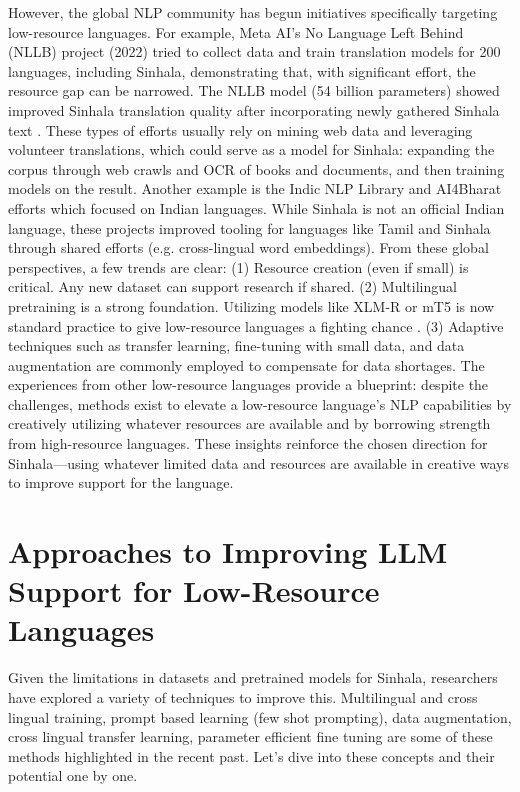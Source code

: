 \documentclass[12pt]{uomthesis}
\begin{document}
However, the global NLP community has begun initiatives specifically targeting low-resource languages. For example, Meta AI's No Language Left Behind (NLLB) project (2022) tried to collect data and train translation models for 200 languages, including Sinhala, demonstrating that, with significant effort, the resource gap can be narrowed. The NLLB model (54 billion parameters) showed improved Sinhala translation quality after incorporating newly gathered Sinhala text \cite{15}. These types of efforts usually rely on mining web data and leveraging volunteer translations, which could serve as a model for Sinhala: expanding the corpus through web crawls and OCR of books and documents, and then training models on the result. Another example is the Indic NLP Library and AI4Bharat efforts which focused on Indian languages. While Sinhala is not an official Indian language, these projects improved tooling for languages like Tamil and Sinhala through shared efforts (e.g. cross-lingual word embeddings). From these global perspectives, a few trends are clear: (1) Resource creation (even if small) is critical. Any new dataset can support research if shared. (2) Multilingual pretraining is a strong foundation. Utilizing models like XLM-R or mT5 is now standard practice to give low-resource languages a fighting chance \cite{2}. (3) Adaptive techniques such as transfer learning, fine-tuning with small data, and data augmentation are commonly employed to compensate for data shortages. The experiences from other low-resource languages provide a blueprint: despite the challenges, methods exist to elevate a low-resource language's NLP capabilities by creatively utilizing whatever resources are available and by borrowing strength from high-resource languages. These insights reinforce the chosen direction for Sinhala—using whatever limited data and resources are available in creative ways to improve support for the language.


\section{Approaches to Improving LLM Support for Low-Resource Languages}
Given the limitations in datasets and pretrained models for Sinhala, researchers have explored a variety of techniques to improve this. Multilingual and cross lingual training, prompt based learning (few shot prompting), data augmentation, cross lingual transfer learning, parameter efficient fine tuning are some of these methods highlighted in the recent past. Let’s dive into these concepts and their potential one by one.
\end{document}
